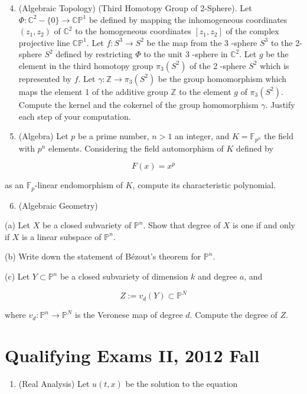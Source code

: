 \documentclass[10pt]{article}
\begin{document}
\begin{enumerate}
  \setcounter{enumi}{3}
  \item (Algebraic Topology) (Third Homotopy Group of 2-Sphere). Let $\Phi: \mathbb{C}^{2}-\{0\} \rightarrow \mathbb{C P}^{1}$ be defined by mapping the inhomogeneous coordinates $\left(z_{1}, z_{2}\right)$ of $\mathbb{C}^{2}$ to the homogeneous coordinates $\left[z_{1}, z_{2}\right]$ of the complex projective line $\mathbb{C P}^{1}$. Let $f: S^{3} \rightarrow S^{2}$ be the map from the 3 -sphere $S^{3}$ to the 2-sphere $S^{2}$ defined by restricting $\Phi$ to the unit 3 -sphere in $\mathbb{C}^{2}$. Let $g$ be the element in the third homotopy group $\pi_{3}\left(S^{2}\right)$ of the 2 -sphere $S^{2}$ which is represented by $f$. Let $\gamma: \mathbb{Z} \rightarrow \pi_{3}\left(S^{2}\right)$ be the group homomorphism which maps the element 1 of the additive group $\mathbb{Z}$ to the element $g$ of $\pi_{3}\left(S^{2}\right)$. Compute the kernel and the cokernel of the group homomorphism $\gamma$. Justify each step of your computation.

  \item (Algebra) Let $p$ be a prime number, $n>1$ an integer, and $K=\mathbb{F}_{p^{n}}$ the field with $p^{n}$ elements. Considering the field automorphism of $K$ defined by

\end{enumerate}

$$
F(x)=x^{p}
$$

as an $\mathbb{F}_{p}$-linear endomorphism of $K$, compute its characteristic polynomial.

\begin{enumerate}
  \setcounter{enumi}{5}
  \item (Algebraic Geometry)
\end{enumerate}

(a) Let $X$ be a closed subvariety of $\mathbb{P}^{n}$. Show that degree of $X$ is one if and only if $X$ is a linear subspace of $\mathbb{P}^{n}$.

(b) Write down the statement of Bézout's theorem for $\mathbb{P}^{n}$.

(c) Let $Y \subset \mathbb{P}^{n}$ be a closed subvariety of dimension $k$ and degree $a$, and

$$
Z:=v_{d}(Y) \subset \mathbb{P}^{N}
$$

where $v_{d}: \mathbb{P}^{n} \rightarrow \mathbb{P}^{N}$ is the Veronese map of degree $d$. Compute the degree of $Z$.

\section{Qualifying Exams II, 2012 Fall}
\begin{enumerate}
  \item (Real Analysis) Let $u(t, x)$ be the solution to the equation
\end{enumerate}
\end{document}
